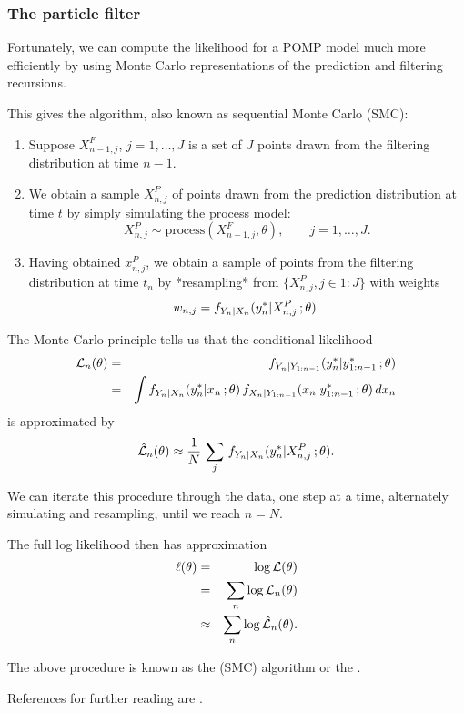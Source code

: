 \documentclass{beamer}\usepackage[]{graphicx}\usepackage[]{color}
\begin{document}
\begin{frame}[fragile]

\frametitle{The particle filter}

\bi
\item Fortunately, we can compute the likelihood for a POMP model much more efficiently by using Monte Carlo representations of the prediction and filtering recursions.
\item This gives the  algorithm, also known as sequential Monte Carlo (SMC):
\ei

\begin{enumerate}
\item Suppose $X_{n-1,j}^{F}$, $j=1,\dots,J$ is a set of $J$ points drawn from the filtering distribution at time $n-1$.

\item We obtain a sample $X_{n,j}^{P}$ of points drawn from the prediction distribution at time $t$ by simply simulating the process model:
$$X_{n,j}^{P} \sim \mathrm{process}(X_{n-1,j}^{F},\theta), \qquad j=1,\dots,J.$$

\item Having obtained $x_{n,j}^{P}$, we obtain a sample of points from the filtering distribution at time $t_n$ by *resampling* from $\big\{X_{n,j}^{P},j\in 1:J\big\}$ with weights 
$$w_{n,j}=f_{Y_n|X_n}(y^*_{n}|X^P_{n,j}\,;\theta).$$

\end{enumerate}

\bi
\item The Monte Carlo principle tells us that the conditional likelihood
\begin{eqnarray*}
\mathcal{L}_n(\theta) &=& f_{Y_n|Y_{1:n-1}}(y^*_n|y^*_{1:n-1}\,;\theta)
\\
&=& 
\int
f_{Y_n|X_n}(y^*_{n}|x_{n}\,;\theta)\,f_{X_n|Y_{1:n-1}}(x_{n}|y^*_{1:n-1}\,;\theta)\, dx_n
\end{eqnarray*}
is approximated by
$$\hat{\mathcal{L}}_n(\theta)  \approx \frac{1}{N}\,\sum_j\, f_{Y_n|X_n}(y^*_{n}|X_{n,j}^{P}\,;\theta).$$

\item We can iterate this procedure through the data, one step at a time, alternately simulating and resampling, until we reach $n=N$.

\item The full log likelihood then has approximation
\begin{eqnarray*}\ell(\theta) 
&=& \log{\mathcal{L}(\theta)} 
\\
&=& \sum_n \log{\mathcal{L}_n(\theta)}
\\
&\approx& \sum_n\log\hat{\mathcal{L}}_n(\theta).
\end{eqnarray*}

\item  The above procedure is known as the  (SMC) algorithm or the .

\item  References for further reading are \citep{kitagawa87,arulampalam02,doucet01}.

\ei

\end{frame}
\end{document}
